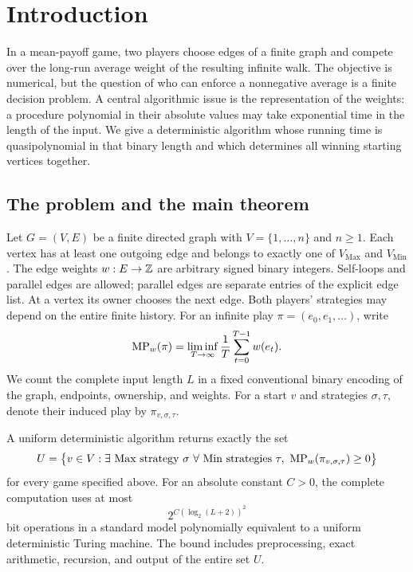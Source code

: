\section{Introduction}
\label{sec:introduction}

In a mean-payoff game, two players choose edges of a finite graph and
compete over the long-run average weight of the resulting infinite
walk. The objective is numerical, but the question of who can enforce
a nonnegative average is a finite decision problem. A central
algorithmic issue is the representation of the weights: a procedure
polynomial in their absolute values may take exponential time in the
length of the input. We give a deterministic algorithm whose running
time is quasipolynomial in that binary length and which determines
all winning starting vertices together.

\subsection{The problem and the main theorem}

Let $G=(V,E)$ be a finite directed graph with
$V=\{1,\ldots,n\}$ and $n\ge1$. Each vertex has at least one
outgoing edge and belongs to exactly one of
$V_{\mathrm{Max}}$ and $V_{\mathrm{Min}}$. The edge weights
$w:E\to\mathbb Z$ are arbitrary signed binary integers. Self-loops and
parallel edges are allowed; parallel edges are separate entries of
the explicit edge list. At a vertex its owner chooses the next edge.
Both players' strategies may depend on the entire finite history.
For an infinite play $\pi=(e_0,e_1,\ldots)$, write
\[
 \operatorname{MP}_w(\pi)=\liminf_{T\to\infty}\frac1T
                         \sum_{t=0}^{T-1}w(e_t).
\]
We count the complete input length $L$ in a fixed conventional binary
encoding of the graph, endpoints, ownership, and weights. For a start
$v$ and strategies $\sigma,\tau$, denote their induced play by
$\pi_{v,\sigma,\tau}$.

\begin{theorem}\label{thm:main}
A uniform deterministic algorithm returns exactly the set
\[
 U=\bigl\{v\in V:\exists\text{ Max strategy }\sigma\ 
       \forall\text{ Min strategies }\tau,
       \ \MP_w(\pi_{v,\sigma,\tau})\ge0\bigr\}
\]
for every game specified above. For an absolute constant $C>0$, the
complete computation uses at most
\[
                      2^{C(\log_2(L+2))^2}
\]
bit operations in a standard model polynomially equivalent to a
uniform deterministic Turing machine. The bound includes
preprocessing, exact arithmetic, recursion, and output of the entire
set $U$.
\end{theorem}

